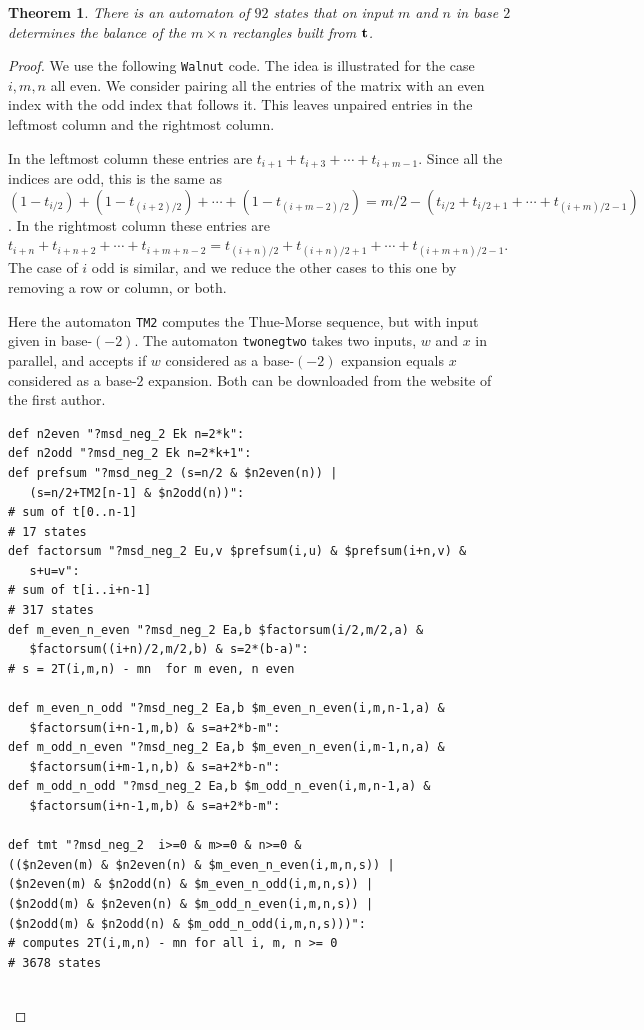 \documentclass[final]{dmtcs-episciences}
\theoremstyle{plain}
\newtheorem{theorem}{Theorem}
\theoremstyle{remark}
\begin{document}
\begin{theorem}
    There is an automaton of $92$ states that on input $m$ and $n$ in base $2$ determines the balance of the $m \times n$ rectangles
    built from $\bf t$.
\end{theorem}

\begin{proof}
We use the following {\tt Walnut} code.
The idea is illustrated for the case $i,m,n$ all even.  We consider pairing all the entries of the matrix with an even index with the odd index that follows it.
This leaves unpaired entries in the leftmost column and the
rightmost column.

In the leftmost column these entries are
$t_{i+1} + t_{i+3} + \cdots + t_{i+m-1}$.
Since all the indices are odd,
this is the same as
$(1-t_{i/2}) +  (1-t_{(i+2)/2}) + \cdots + (1-t_{(i+m-2)/2})
= m/2 - (t_{i/2} + t_{i/2+1} + \cdots + t_{(i+m)/2-1})$.
In the rightmost column these entries are
$t_{i+n} + t_{i+n+2} + \cdots + t_{i+m+n-2} =
t_{(i+n)/2} + t_{(i+n)/2 + 1} + \cdots +
t_{(i+m+n)/2 -1}$.
The case of $i$ odd is similar, and we reduce the other cases to this one by removing a row or column, or both.

Here the automaton {\tt TM2} computes the Thue-Morse sequence, but with input given in base-$(-2)$.  The automaton
{\tt twonegtwo} takes two inputs,
$w$ and $x$ in parallel, and accepts if $w$ considered as a base-$(-2)$ expansion equals $x$ considered as a base-$2$ expansion.  Both can be downloaded from the website of the first author.
\begin{verbatim}
def n2even "?msd_neg_2 Ek n=2*k":
def n2odd "?msd_neg_2 Ek n=2*k+1":
def prefsum "?msd_neg_2 (s=n/2 & $n2even(n)) | 
   (s=n/2+TM2[n-1] & $n2odd(n))":
# sum of t[0..n-1]
# 17 states
def factorsum "?msd_neg_2 Eu,v $prefsum(i,u) & $prefsum(i+n,v) & 
   s+u=v":
# sum of t[i..i+n-1]
# 317 states
def m_even_n_even "?msd_neg_2 Ea,b $factorsum(i/2,m/2,a) & 
   $factorsum((i+n)/2,m/2,b) & s=2*(b-a)":
# s = 2T(i,m,n) - mn  for m even, n even

def m_even_n_odd "?msd_neg_2 Ea,b $m_even_n_even(i,m,n-1,a) & 
   $factorsum(i+n-1,m,b) & s=a+2*b-m":
def m_odd_n_even "?msd_neg_2 Ea,b $m_even_n_even(i,m-1,n,a) & 
   $factorsum(i+m-1,n,b) & s=a+2*b-n":
def m_odd_n_odd "?msd_neg_2 Ea,b $m_odd_n_even(i,m,n-1,a) & 
   $factorsum(i+n-1,m,b) & s=a+2*b-m":

def tmt "?msd_neg_2  i>=0 & m>=0 & n>=0 & 
(($n2even(m) & $n2even(n) & $m_even_n_even(i,m,n,s)) |
($n2even(m) & $n2odd(n) & $m_even_n_odd(i,m,n,s)) |
($n2odd(m) & $n2even(n) & $m_odd_n_even(i,m,n,s)) |
($n2odd(m) & $n2odd(n) & $m_odd_n_odd(i,m,n,s)))":
# computes 2T(i,m,n) - mn for all i, m, n >= 0
# 3678 states


\end{verbatim}
\end{proof}
\end{document}
